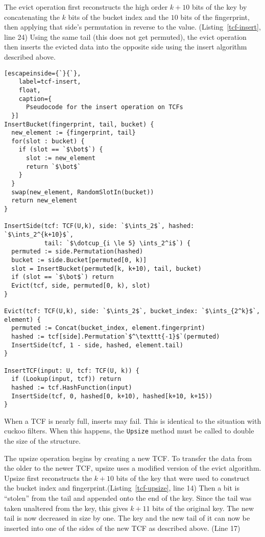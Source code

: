 \documentclass[sigconf, nonacm]{acmart}
\newcommand{\ints}{\mathbb{Z}}
\newcommand{\dotcup}{\ensuremath{\mathaccent\cdot\cup}}
\begin{document}
The evict operation first reconstructs the high order $k + 10$ bits of the key by concatenating the $k$ bits of the bucket index and the $10$ bits of the fingerprint, then applying that side's permutation in reverse to the value. (Listing~\ref{tcf-insert}, line 24)
Using the same tail (this does not get permuted), the evict operation then inserts the evicted data into the opposite side using the insert algorithm described above.

\begin{lstlisting}[escapeinside={`}{`},
    label=tcf-insert,
    float,
    caption={
      Pseudocode for the insert operation on TCFs
  }]
InsertBucket(fingerprint, tail, bucket) {
  new_element := {fingerprint, tail}
  for(slot : bucket) {
    if (slot == `$\bot$`) {
      slot := new_element
      return `$\bot$`
    }
  }
  swap(new_element, RandomSlotIn(bucket))
  return new_element
}

InsertSide(tcf: TCF(U,k), side: `$\ints_2$`, hashed: `$\ints_2^{k+10}$`,
           tail: `$\dotcup_{i \le 5} \ints_2^i$`) {
  permuted := side.Permutation(hashed)
  bucket := side.Bucket[permuted[0, k)]
  slot = InsertBucket(permuted[k, k+10), tail, bucket)
  if (slot == `$\bot$`) return
  Evict(tcf, side, permuted[0, k), slot)
}

Evict(tcf: TCF(U,k), side: `$\ints_2$`, bucket_index: `$\ints_{2^k}$`, element) {
  permuted := Concat(bucket_index, element.fingerprint)
  hashed := tcf[side].Permutation`$^\texttt{-1}$`(permuted)
  InsertSide(tcf, 1 - side, hashed, element.tail)
}

InsertTCF(input: U, tcf: TCF(U, k)) {
  if (Lookup(input, tcf)) return
  hashed := tcf.HashFunction(input)
  InsertSide(tcf, 0, hashed[0, k+10), hashed[k+10, k+15))
}
\end{lstlisting}

When a TCF is nearly full, inserts may fail.
This is identical to the situation with cuckoo filters.
When this happens, the \texttt{Upsize} method must be called to double the size of the structure.

The upsize operation begins by creating a new TCF.
To transfer the data from the older to the newer TCF, upsize uses a modified version of the evict algorithm.
Upsize first reconstructs the $k+10$ bits of the key that were used to construct the bucket index and fingerprint.(Listing~\ref{tcf-upsize}, line 14)
Then a bit is ``stolen'' from the tail and appended onto the end of the key.
Since the tail was taken unaltered from the key, this gives $k+11$ bits of the original key.
The new tail is now decreased in size by one.
The key and the new tail of it can now be inserted into one of the sides of the new TCF as described above. (Line 17)
\end{document}
